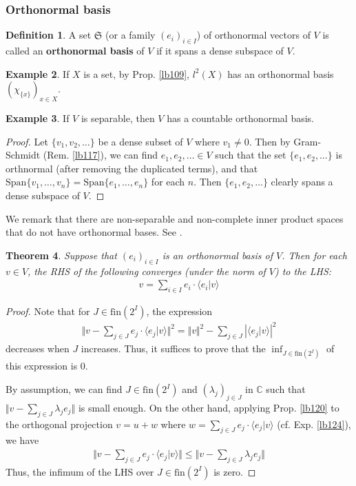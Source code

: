 \documentclass[12pt,b5paper,notitlepage]{article}
\theoremstyle{definition}
\newtheorem{df}{Definition}[section]
\newtheorem{eg}[df]{Example}
\theoremstyle{plain}
\newtheorem{thm}[df]{Theorem}
\newcommand{\fk}{\mathfrak}
\newcommand{\Span}{\mathrm{Span}}
\newcommand{\bk}[1]{\langle {#1}\rangle}
\newcommand{\Cbb}{\mathbb C}
\newcommand{\fin}{\mathrm{fin}}
\numberwithin{equation}{section}
\begin{document}
\subsubsection{Orthonormal basis}



\begin{df}\label{lb121}
A set $\fk S$ (or a family $(e_i)_{i\in I}$) of orthonormal vectors of $V$ is called an \textbf{orthonormal basis}  of $V$ if it spans a dense subspace of $V$.  
\end{df}

\begin{eg}
If $X$ is a set, by Prop. \ref{lb109}, $l^2(X)$ has an orthonormal basis $(\chi_{\{x\}})_{x\in X}$.
\end{eg}


\begin{eg}\label{lb122}
If $V$ is separable, then $V$ has a countable orthonormal basis.
\end{eg}

\begin{proof}
Let $\{v_1,v_2,\dots\}$ be a dense subset of $V$ where $v_1\neq 0$. Then by Gram-Schmidt (Rem. \ref{lb117}), we can find $e_1,e_2,\dots\in V$ such that the set $\{e_1,e_2,\dots\}$ is orthnormal (after removing the duplicated terms), and that $\Span\{v_1,\dots,v_n\}=\Span\{e_1,\dots,e_n\}$ for each $n$. Then $\{e_1,e_2,\dots\}$ clearly spans a dense subspace of $V$.
\end{proof}

We remark that there are non-separable and non-complete inner product spaces that do not have orthonormal bases. See \cite{Gud74}.


\begin{thm}\label{lb123}
Suppose that $(e_i)_{i\in I}$ is an orthonormal basis of $V$. Then for each $v\in V$, the RHS of the following converges (under the norm of $V$) to the LHS:
\begin{align}
v=\sum_{i\in I}e_i\cdot\bk{e_i|v}
\end{align}
\end{thm}

\begin{proof}
Note that for $J\in\fin(2^I)$, the expression
\begin{align*}
\Big\Vert v-\sum_{j\in J}e_j\cdot\bk{e_j|v}\Big\Vert^2=\Vert v\Vert^2-\sum_{j\in J}|\bk{e_j|v}|^2
\end{align*}
decreases when $J$ increases. Thus, it suffices to prove that the $\inf_{J\in \fin(2^I)}$ of this expression is $0$. 

By assumption,  we can find $J\in\fin(2^I)$ and $(\lambda_j)_{j\in J}$ in $\Cbb$ such that $\Vert v-\sum_{j\in J}\lambda_je_j\Vert$ is small enough. On the other hand, applying Prop. \ref{lb120} to the orthogonal projection $v=u+w$ where $w=\sum_{j\in J}e_j\cdot\bk{e_j|v}$ (cf. Exp. \ref{lb124}), we have
\begin{align}
\Big\Vert v-\sum_{j\in J}e_j\cdot\bk{e_j|v}\Big\Vert\leq \Big\Vert v-\sum_{j\in J}\lambda_je_j\Big\Vert
\end{align}
Thus, the infimum of the LHS over $J\in\fin(2^I)$ is zero.
\end{proof}
\end{document}
